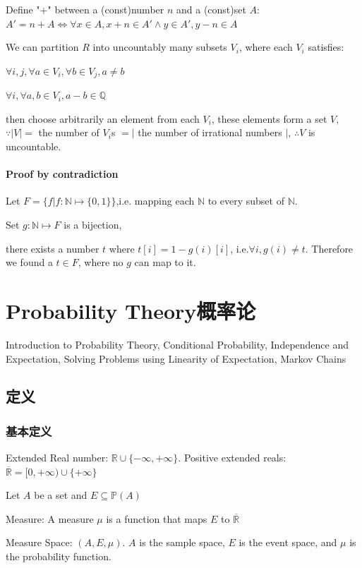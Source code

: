 \documentclass[12pt,a4paper]{ctexrep}
\begin{document}
Define "+" between a (const)number $n$ and a (const)set $A$: $A' = n+A \iff \forall x\in A, x+n \in A' \wedge y \in A', y-n \in A$

We can partition $R$ into uncountably many subsets $V_i$, where each $V_i$ satisfies:

$\forall i,j, \forall a\in V_i, \forall b \in V_j, a \neq b$

$\forall i, \forall a,b \in V_i, a-b \in \mathbb{Q}$

then choose arbitrarily an element from each $V_i$, these elements form a set $V$, $\because |V| = $ the number of $V_i$s $= |$ the number of irrational numbers $|$, $\therefore V $ is uncountable.

\subsubsection{Proof by contradiction}
Let $F = \{f|f:\mathbb{N}\mapsto\{0,1\}\}$,i.e. mapping each $\mathbb{N}$ to every subset of $\mathbb{N}$.

Set $g:\mathbb{N}\mapsto F$ is a bijection, 

there exists a number $t$ where $t[i] = 1-g(i)[i]$, i.e.$\forall i, g(i) \neq t$. Therefore we found a $t \in F$, where no $g$ can map to it. 

\chapter{Probability Theory概率论}
Introduction to Probability Theory, Conditional Probability, Independence and Expectation, Solving Problems using Linearity of Expectation, Markov Chains
\section{定义}
\subsection{基本定义}
Extended Real number: $\mathbb{R}\cup \{-\infty,+\infty\}$. Positive extended reals:$\overline{\mathbb{R}} = [0,+\infty) \cup \{+\infty\}$

Let $A$ be a set and $E \subseteq \mathbb{P}(A)$

Measure: A measure $\mu$ is a function that maps $E$ to $\overline{\mathbb{R}}$

Measure Space: $(A,E,\mu)$. $A$ is the sample space, $E$ is the event space, and $\mu$ is the probability function.
\end{document}
